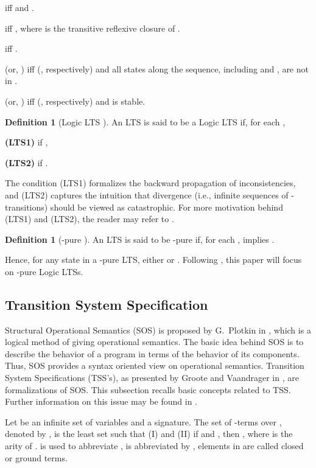 \documentclass{elsarticle}
\theoremstyle{plain}
\theoremstyle{definition}
\newtheorem{mydefn}[theorem]{Definition}
\begin{document}
 iff  and .

 iff , where  is the transitive reflexive closure of .

 iff .

 (or, ) iff   (, respectively) and all states along the sequence, including  and , are not in .

 (or, ) iff  (, respectively) and  is stable.

\begin{mydefn}[Logic LTS \cite{Luttgen10}]\label{D:LLTS}
  An LTS  is said to be a Logic LTS if, for each ,

\noindent\textbf{(LTS1) } if ,

\noindent\textbf{(LTS2)}  if .
\end{mydefn}

The condition (LTS1) formalizes the backward propagation of inconsistencies, and (LTS2) captures the intuition that divergence (i.e., infinite sequences of -transitions) should be viewed as catastrophic.
For more motivation behind (LTS1) and (LTS2), the reader may refer to \cite{Luttgen10}.

\begin{mydefn}[-pure  \cite{Luttgen10}]
An LTS  is said to be {}-pure if, for each ,  implies .
\end{mydefn}

Hence, for any state  in a -pure LTS, either  or .
Following \cite{Luttgen10}, this paper will focus on -pure Logic LTSs.


\subsection{Transition System Specification}
Structural Operational Semantics (SOS) is proposed by G.~Plotkin in \cite{Plotkin81}, which is a logical method of giving operational semantics.
The basic idea behind SOS is to describe the behavior of a program in terms of the behavior of its components.
Thus, SOS provides a syntax oriented view on operational semantics.
Transition System Specifications (TSS's), as presented by Groote and Vaandrager in \cite{Groote92}, are formalizations of SOS.
This subsection recalls basic concepts related to TSS.
Further information on this issue may be found in \cite{Aceto01,Bol96,Groote92}.

 Let  be an infinite set of variables and   a signature. The set of -terms over , denoted by , is the least set such that (I)  and (II) if  and , then , where  is the arity of .  is used to abbreviate ,  is abbreviated by , elements in  are called closed or ground terms.
\end{document}

